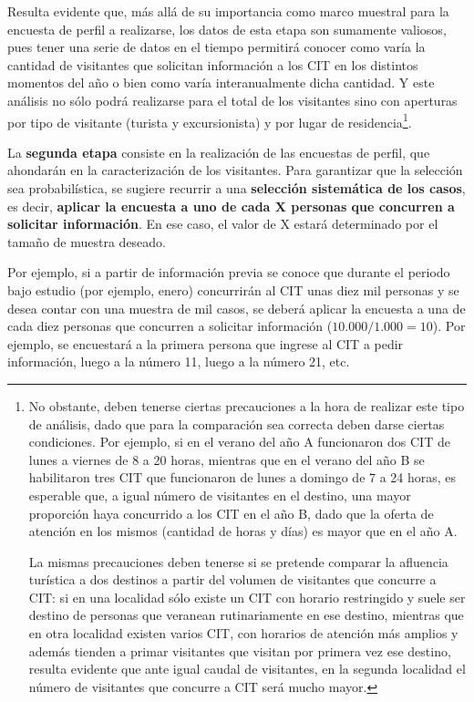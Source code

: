 \documentclass[
]{book}
\begin{document}
Resulta evidente que, más allá de su importancia como marco muestral para la encuesta de perfil a realizarse, los datos de esta etapa son sumamente valiosos, pues tener una serie de datos en el tiempo permitirá conocer como varía la cantidad de visitantes que solicitan información a los CIT en los distintos momentos del año o bien como varía interanualmente dicha cantidad. Y este análisis no sólo podrá realizarse para el total de los visitantes sino con aperturas por tipo de visitante (turista y excursionista) y por lugar de residencia\footnote{No obstante, deben tenerse ciertas precauciones a la hora de realizar este tipo de análisis, dado que para la comparación sea correcta deben darse ciertas condiciones. Por ejemplo, si en el verano del año A funcionaron dos CIT de lunes a viernes de 8 a 20 horas, mientras que en el verano del año B se habilitaron tres CIT que funcionaron de lunes a domingo de 7 a 24 horas, es esperable que, a igual número de visitantes en el destino, una mayor proporción haya concurrido a los CIT en el año B, dado que la oferta de atención en los mismos (cantidad de horas y días) es mayor que en el año A.

  La mismas precauciones deben tenerse si se pretende comparar la afluencia turística a dos destinos a partir del volumen de visitantes que concurre a CIT: si en una localidad sólo existe un CIT con horario restringido y suele ser destino de personas que veranean rutinariamente en ese destino, mientras que en otra localidad existen varios CIT, con horarios de atención más amplios y además tienden a primar visitantes que visitan por primera vez ese destino, resulta evidente que ante igual caudal de visitantes, en la segunda localidad el número de visitantes que concurre a CIT será mucho mayor.}.

La \textbf{segunda etapa} consiste en la realización de las encuestas de perfil, que ahondarán en la caracterización de los visitantes. Para garantizar que la selección sea probabilística, se sugiere recurrir a una \textbf{selección sistemática de los casos}, es decir, \textbf{aplicar la encuesta a uno de cada X personas que concurren a solicitar información}. En ese caso, el valor de X estará determinado por el tamaño de muestra deseado.

Por ejemplo, si a partir de información previa se conoce que durante el periodo bajo estudio (por ejemplo, enero) concurrirán al CIT unas diez mil personas y se desea contar con una muestra de mil casos, se deberá aplicar la encuesta a una de cada diez personas que concurren a solicitar información (\(10.000/1.000=10\)). Por ejemplo, se encuestará a la primera persona que ingrese al CIT a pedir información, luego a la número 11, luego a la número 21, etc.
\end{document}
